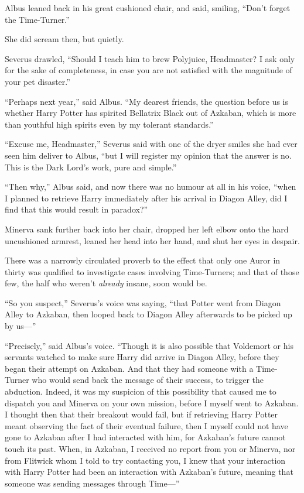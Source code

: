 Albus leaned back in his great cushioned chair, and said, smiling, “Don’t forget the Time-Turner.”

She did scream then, but quietly.

Severus drawled, “Should I teach him to brew Polyjuice, Headmaster? I ask only for the sake of completeness, in case you are not satisfied with the magnitude of your pet disaster.”

“Perhaps next year,” said Albus. “My dearest friends, the question before us is whether Harry Potter has spirited Bellatrix Black out of Azkaban, which is more than youthful high spirits even by my tolerant standards.”

“Excuse me, Headmaster,” Severus said with one of the dryer smiles she had ever seen him deliver to Albus, “but I will register my opinion that the answer is no. This is the Dark Lord’s work, pure and simple.”

“Then why,” Albus said, and now there was no humour at all in his voice, “when I planned to retrieve Harry immediately after his arrival in Diagon Alley, did I find that this would result in paradox?”

Minerva sank further back into her chair, dropped her left elbow onto the hard uncushioned armrest, leaned her head into her hand, and shut her eyes in despair.

There was a narrowly circulated proverb to the effect that only one Auror in thirty was qualified to investigate cases involving Time-Turners; and that of those few, the half who weren’t \emph{already} insane, soon would be.

“So you suspect,” Severus’s voice was saying, “that Potter went from Diagon Alley to Azkaban, then looped back to Diagon Alley afterwards to be picked up by us—”

“Precisely,” said Albus’s voice. “Though it is also possible that Voldemort or his servants watched to make sure Harry did arrive in Diagon Alley, before they began their attempt on Azkaban. And that they had someone with a Time-Turner who would send back the message of their success, to trigger the abduction. Indeed, it was my suspicion of this possibility that caused me to dispatch you and Minerva on your own mission, before I myself went to Azkaban. I thought then that their breakout would fail, but if retrieving Harry Potter meant observing the fact of their eventual failure, then I myself could not have gone to Azkaban after I had interacted with him, for Azkaban’s future cannot touch its past. When, in Azkaban, I received no report from you or Minerva, nor from Flitwick whom I told to try contacting you, I knew that your interaction with Harry Potter had been an interaction with Azkaban’s future, meaning that someone was sending messages through Time—”

